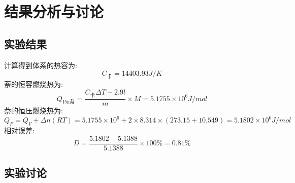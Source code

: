 \documentclass[11pt]{report}
\begin{document}
\chapter{结果分析与讨论}
\label{sec:org6d45bf5}
\section{实验结果}
\label{sec:org76fc4f1}
计算得到体系的热容为:
\[
    C_{卡}=14403.93J/K
    \]
萘的恒容燃烧热为:
\[
    Q_{Vm萘}=
    \frac{C_{卡}\Delta T-2.9l}{m}\times M=
    5.1755\times 10^{6}J/mol
    \]
萘的恒压燃烧热为:
\[
    Q_{P}=Q_{V}+\Delta n(RT)=5.1755\times 10^{6}+2\times 8.314 \times (273.15+10.549)=
    5.1802\times 10^{6}J/mol
    \]
相对误差:
\[
    D=\frac{5.1802-5.1388}{5.1388}\times 100\%=0.81\%
    \]
\section{实验讨论}
\label{sec:org761bb19}
\end{document}
